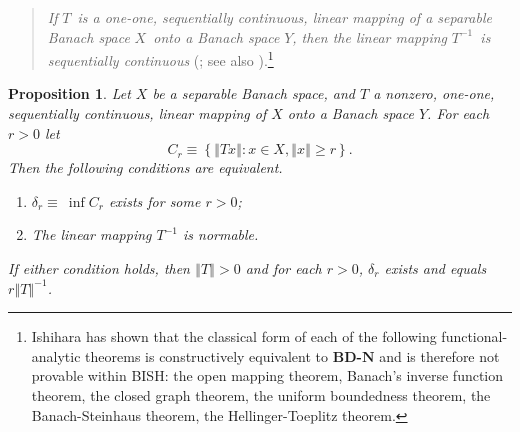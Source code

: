 \documentclass[11pt]{article}%
\newtheorem{proposition}[theorem]{Proposition}
\begin{document}
\begin{quote}
\emph{If }$T$\emph{\ is a one-one, sequentially continuous, linear mapping of
a separable Banach space }$X$\emph{\ onto a Banach space }$Y$\emph{, then the
linear mapping }$T^{-1}$\emph{\ is sequentially continuous} (\cite[Thm
1]{Ish1994}; see also \cite[Thm 3.4]{IshV}).\footnote{%
\normalfont\sf
Ishihara \cite[Thm 21]{Ish2001} has shown that the classical form of each of
the following functional-analytic theorems is constructively equivalent to
\textbf{BD-}$\mathbf{N}$ and is therefore not provable within BISH: the open
mapping theorem, Banach's inverse function theorem, the closed graph theorem,
the uniform boundedness theorem, the Banach-Steinhaus theorem, the
Hellinger-Toeplitz theorem.}
\end{quote}

\begin{proposition}
\label{apr21p1}Let $X$ be a separable Banach space, and $T$ a nonzero,
one-one, sequentially continuous, linear mapping of $X$ onto a Banach space
$Y$. For each $r>0$ let%
\[
C_{r}\equiv\left\{  \left\Vert Tx\right\Vert :x\in X,\left\Vert x\right\Vert
\geq r\right\}  .
\]
Then the following conditions are equivalent.

\begin{enumerate}
\item[\emph{(i)}] $\delta_{r}\equiv\ \inf C_{r}$ exists for some $r>0$;

\item[\emph{(ii)}] The linear mapping $T^{-1}$ is normable.
\end{enumerate}

%

\noindent
If either condition holds, then $\left\Vert T\right\Vert >0$ and for each
$r>0$, $\delta_{r}$ exists and equals $r\left\Vert T\right\Vert ^{-1}$.
\end{proposition}
\end{document}
